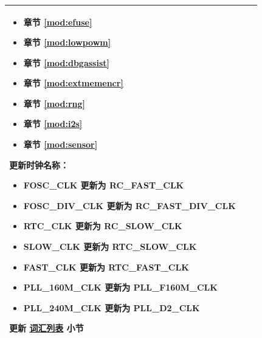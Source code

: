 \begin{longtable}[l]{ | m{2cm} | m{1.5cm} | m{12cm} | }
\begin{itemize}
                \item 章节 \ref{mod:efuse} \textit{\nameref{mod:efuse}}
                \item 章节 \ref{mod:lowpowm} \textit{\nameref{mod:lowpowm}}
                \item 章节 \ref{mod:dbgassist} \textit{\nameref{mod:dbgassist}}
                \item 章节 \ref{mod:extmemencr} \textit{\nameref{mod:extmemencr}}
                \item 章节 \ref{mod:rng} \textit{\nameref{mod:rng}}
                \item 章节 \ref{mod:i2s} \textit{\nameref{mod:i2s}}
                \item 章节 \ref{mod:sensor} \textit{\nameref{mod:sensor}}
            \end{itemize}
        更新时钟名称：
        \begin{itemize}
        \item FOSC\_CLK 更新为 RC\_FAST\_CLK
        \item FOSC\_DIV\_CLK 更新为 RC\_FAST\_DIV\_CLK
        \item RTC\_CLK 更新为 RC\_SLOW\_CLK
        \item SLOW\_CLK 更新为 RTC\_SLOW\_CLK
        \item FAST\_CLK 更新为 RTC\_FAST\_CLK
        \item PLL\_160M\_CLK 更新为 PLL\_F160M\_CLK
        \item PLL\_240M\_CLK 更新为 PLL\_D2\_CLK
        \end{itemize}%
        更新 \hyperref[glossary]{词汇列表} 小节
             \\\hline


\end{longtable}
